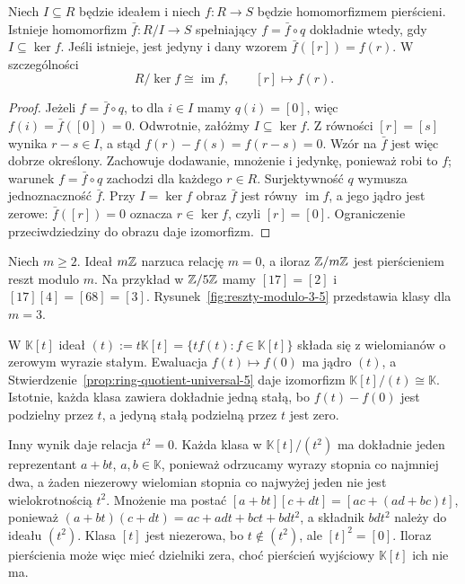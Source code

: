 \begin{stwierdzenie}
\label{prop:ring-quotient-universal-5}
Niech $I\subseteq R$ będzie ideałem i niech
$f:R\to S$ będzie homomorfizmem pierścieni.
Istnieje homomorfizm $\bar f:R/I\to S$ spełniający
$f=\bar f\circ q$ dokładnie wtedy, gdy $I\subseteq\ker f$.
Jeśli istnieje, jest jedyny i dany wzorem $\bar f([r])=f(r)$.
W szczególności
\[
 R/\ker f\cong\operatorname{im}f,
 \qquad [r]\longmapsto f(r).
\]
\end{stwierdzenie}
\begin{proof}
Jeżeli $f=\bar f\circ q$, to dla $i\in I$ mamy
$q(i)=[0]$, więc $f(i)=\bar f([0])=0$.
Odwrotnie, załóżmy $I\subseteq\ker f$. Z równości
$[r]=[s]$ wynika $r-s\in I$, a stąd
$f(r)-f(s)=f(r-s)=0$. Wzór na $\bar f$ jest więc
dobrze określony. Zachowuje dodawanie, mnożenie i jedynkę,
ponieważ robi to $f$; warunek $f=\bar f\circ q$ zachodzi
dla każdego $r\in R$. Surjektywność $q$ wymusza
jednoznaczność $\bar f$. Przy $I=\ker f$ obraz $\bar f$
jest równy $\operatorname{im}f$, a jego jądro jest zerowe:
$\bar f([r])=0$ oznacza $r\in\ker f$, czyli $[r]=[0]$.
Ograniczenie przeciwdziedziny do obrazu daje izomorfizm.
\end{proof}

\begin{przyklad}
\label{prz:idealy-ilorazy}
Niech $m\geq2$. Ideał $m\mathbb{Z}$ narzuca
relację $m=0$, a iloraz $\mathbb{Z}/m\mathbb{Z}$ jest pierścieniem
reszt modulo $m$. Na przykład w $\mathbb{Z}/5\mathbb{Z}$ mamy
$[17]=[2]$ i $[17][4]=[68]=[3]$.
Rysunek~\ref{fig:reszty-modulo-3-5} przedstawia
klasy dla $m=3$.

W $\mathbb K[t]$
ideał $(t):=t\mathbb K[t]=
\{tf(t):f\in\mathbb K[t]\}$ składa się z wielomianów
o zerowym wyrazie stałym. Ewaluacja
$f(t)\mapsto f(0)$ ma jądro $(t)$,
a Stwierdzenie~\ref{prop:ring-quotient-universal-5} daje izomorfizm
$\mathbb K[t]/(t)\cong\mathbb K$.
Istotnie, każda klasa zawiera dokładnie
jedną stałą, bo $f(t)-f(0)$ jest podzielny
przez $t$, a jedyną stałą podzielną przez $t$ jest zero.

Inny wynik daje relacja $t^2=0$.
Każda klasa w $\mathbb K[t]/(t^2)$ ma dokładnie
jeden reprezentant $a+bt$, $a,b\in\mathbb K$,
ponieważ odrzucamy wyrazy stopnia co najmniej dwa,
a żaden niezerowy wielomian stopnia co najwyżej jeden
nie jest wielokrotnością $t^2$.
Mnożenie ma postać
$[a+bt][c+dt]=[ac+(ad+bc)t]$, ponieważ
$(a+bt)(c+dt)=ac+adt+bct+bdt^2$,
a składnik $bdt^2$ należy do ideału $(t^2)$.
Klasa $[t]$ jest niezerowa, bo $t\notin(t^2)$,
ale $[t]^2=[0]$.
Iloraz pierścienia może więc mieć dzielniki zera,
choć pierścień wyjściowy $\mathbb K[t]$ ich nie ma.
\end{przyklad}


